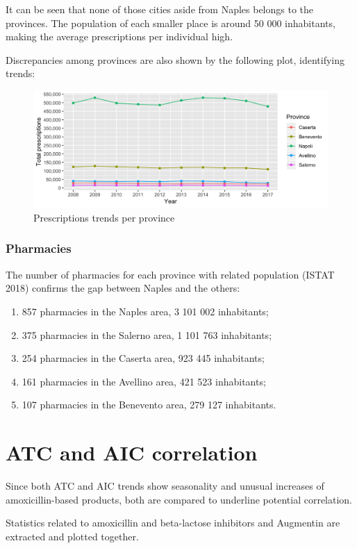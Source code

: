 It can be seen that none of those cities aside from Naples belongs to the provinces. The population of each smaller place is around 50 000 inhabitants, making the average prescriptions per individual high.

Discrepancies among provinces are also shown by the following plot, identifying trends:
\begin{figure}[h]
	\centering
	\includegraphics[scale=0.3]{../plots/provinces.png}
	\caption{\small Prescriptions trends per province}
\end{figure}

\subsubsection{Pharmacies}
The number of pharmacies for each province with related population (ISTAT 2018) confirms the gap between Naples and the others: 
\begin{enumerate}
	\item 857 pharmacies in the Naples area, 3 101 002 inhabitants;
	\item 375 pharmacies in the Salerno area, 1 101 763 inhabitants;
	\item 254 pharmacies in the Caserta area, 923 445 inhabitants;
	\item 161 pharmacies in the Avellino area, 421 523 inhabitants;
	\item 107 pharmacies in the Benevento area, 279 127 inhabitants.
\end{enumerate}

\section[ATC-AIC]{ATC and AIC correlation}
Since both ATC and AIC trends show seasonality and unusual increases of amoxicillin-based products, both are compared to underline potential correlation.

Statistics related to amoxicillin and beta-lactose inhibitors and Augmentin are extracted and plotted together.

